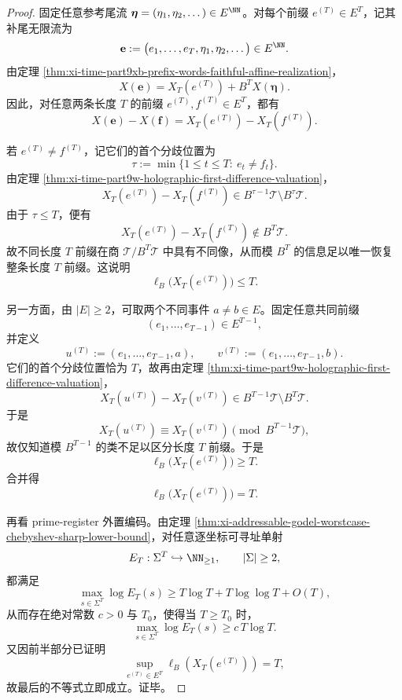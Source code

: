 \begin{proof}
固定任意参考尾流 \(\boldsymbol\eta=(\eta_1,\eta_2,\dots)\in E^{\NN}\)。对每个前缀 \(e^{(T)}\in E^T\)，记其补尾无限流为
\[
\mathbf e:=\bigl(e_1,\dots,e_T,\eta_1,\eta_2,\dots\bigr)\in E^{\NN}.
\]
由定理 \ref{thm:xi-time-part9xb-prefix-words-faithful-affine-realization}，
\[
X(\mathbf e)=X_T(e^{(T)})+B^T X(\boldsymbol\eta).
\]
因此，对任意两条长度 \(T\) 的前缀 \(e^{(T)},f^{(T)}\in E^T\)，都有
\[
X(\mathbf e)-X(\mathbf f)
=
X_T(e^{(T)})-X_T(f^{(T)}).
\]

若 \(e^{(T)}\neq f^{(T)}\)，记它们的首个分歧位置为
\[
\tau:=\min\{1\le t\le T:\ e_t\neq f_t\}.
\]
由定理 \ref{thm:xi-time-part9w-holographic-first-difference-valuation}，
\[
X_T(e^{(T)})-X_T(f^{(T)})
\in
B^{\tau-1}\mathcal T\setminus B^\tau\mathcal T.
\]
由于 \(\tau\le T\)，便有
\[
X_T(e^{(T)})-X_T(f^{(T)})\notin B^T\mathcal T.
\]
故不同长度 \(T\) 前缀在商 \(\mathcal T/B^T\mathcal T\) 中具有不同像，从而模 \(B^T\) 的信息足以唯一恢复整条长度 \(T\) 前缀。这说明
\[
\ell_B\!\bigl(X_T(e^{(T)})\bigr)\le T.
\]

另一方面，由 \(|E|\ge 2\)，可取两个不同事件 \(a\neq b\in E\)。固定任意共同前缀
\[
(e_1,\dots,e_{T-1})\in E^{T-1},
\]
并定义
\[
u^{(T)}:=(e_1,\dots,e_{T-1},a),
\qquad
v^{(T)}:=(e_1,\dots,e_{T-1},b).
\]
它们的首个分歧位置恰为 \(T\)，故再由定理
\ref{thm:xi-time-part9w-holographic-first-difference-valuation}，
\[
X_T(u^{(T)})-X_T(v^{(T)})
\in
B^{T-1}\mathcal T\setminus B^T\mathcal T.
\]
于是
\[
X_T(u^{(T)})\equiv X_T(v^{(T)})\pmod{B^{T-1}\mathcal T},
\]
故仅知道模 \(B^{T-1}\) 的类不足以区分长度 \(T\) 前缀。于是
\[
\ell_B\!\bigl(X_T(e^{(T)})\bigr)\ge T.
\]
合并得
\[
\ell_B\!\bigl(X_T(e^{(T)})\bigr)=T.
\]

再看 prime-register 外置编码。由定理
\ref{thm:xi-addressable-godel-worstcase-chebyshev-sharp-lower-bound}，对任意逐坐标可寻址单射
\[
E_T:\Sigma^T\hookrightarrow \NN_{\ge 1},
\qquad |\Sigma|\ge 2,
\]
都满足
\[
\max_{s\in\Sigma^T}\log E_T(s)\ge T\log T+T\log\log T+O(T),
\]
从而存在绝对常数 \(c>0\) 与 \(T_0\)，使得当 \(T\ge T_0\) 时，
\[
\max_{s\in\Sigma^T}\log E_T(s)\ge c\,T\log T.
\]
又因前半部分已证明
\[
\sup_{e^{(T)}\in E^T}\ell_B(X_T(e^{(T)}))=T,
\]
故最后的不等式立即成立。证毕。
\end{proof}

